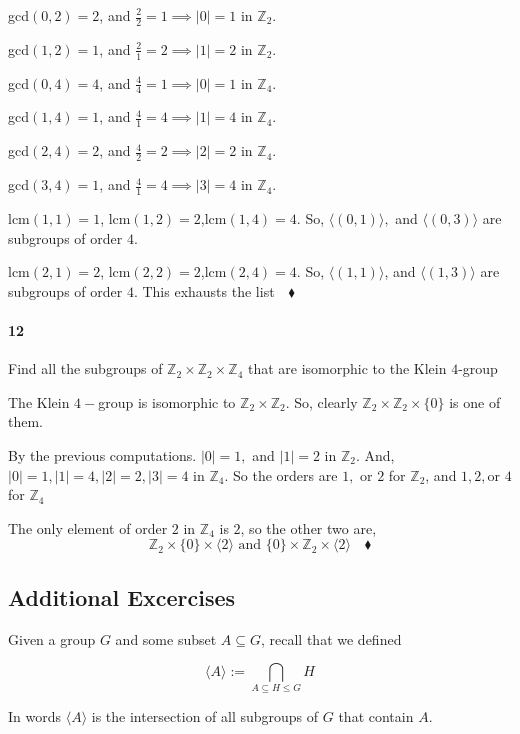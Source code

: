\documentclass{article}
\newcommand\Z{\mathbb{Z}}
\begin{document}
gcd$(0,2) = 2$, and $\frac{2}{2} = 1 \implies |0| = 1$  in $\Z_2$.

gcd$(1,2) = 1$, and $\frac{2}{1} = 2 \implies |1| = 2$  in $\Z_2$.

gcd$(0,4) = 4$, and $\frac{4}{4} = 1 \implies |0| = 1$  in $\Z_4$.

gcd$(1,4) = 1$, and $\frac{4}{1} = 4 \implies |1| = 4$  in $\Z_4$.

gcd$(2,4) = 2$, and $\frac{4}{2} = 2 \implies |2| = 2$  in $\Z_4$.

gcd$(3,4) = 1$, and $\frac{4}{1} = 4 \implies |3| = 4$  in $\Z_4$.

lcm$(1,1) = 1$, lcm$(1,2) = 2$,lcm$(1,4) = 4$. So, $\langle (0,1)
\rangle,$ and $\langle (0,3) \rangle$ are subgroups of order $4$.

lcm$(2,1) = 2$, lcm$(2,2) = 2$,lcm$(2,4) = 4$. So, $\langle (1,1) \rangle$, and $\langle (1,3) \rangle$ are
subgroups of order $4$. This exhausts the list$\quad \blacklozenge$

\paragraph{12} Find all the subgroups of $\Z_2\times\Z_2 \times\Z_4$
that are isomorphic to the Klein $4$-group


The Klein $4-$group is isomorphic to $\Z_2\times\Z_2$. So, clearly
$\Z_2\times\Z_2 \times\{0\}$ is one of them.

By the previous computations. $|0| = 1,$ and $|1| = 2$ in $\Z_2$. And,
$|0| = 1, |1| = 4,|2|=2,|3|=4$  in $\Z_4$. So the orders are $1,$ or
$2$ for $\Z_2$, and $1,2,$or $4$ for $\Z_4$

The only element of order $2$ in $\Z_4$ is $2$, so the other two are,
$$\Z_2\times \{0\} \times \langle 2 \rangle\text{ and }\{0\}\times
\Z_2\times \langle 2 \rangle\quad \blacklozenge$$



\subsection*{Additional Excercises}

Given a group $G$ and some subset $A\subseteq G$, recall that we
defined

$$\langle A \rangle := \bigcap_{A\subseteq H\leq G} H$$

In words $\langle A\rangle$ is the intersection of all subgroups of
$G$ that
contain $A$.
\end{document}
